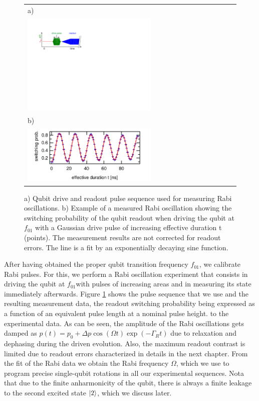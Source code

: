 \begin{figure}[h!]
\begin{center}
\begin{tabular}{l}
a) \\ \includegraphics[width=0.6\textwidth]{"./material/figures/measurement/qubit_rabi_oscillation"} \\
b) \\ \includegraphics[width=0.6\textwidth]{"./data/ct5/2011_04_21 - grover and tomo/example - qubit 2 rabi"} \\
\end{tabular}
\end{center}
\caption[]{a) Qubit drive and readout pulse sequence used for measuring Rabi oscillations. b) Example of a measured Rabi oscillation showing the switching probability of the qubit readout when driving the qubit at $f_{01}$ with a Gaussian drive pulse of increasing effective duration t (points). The measurement results are not corrected for readout errors. The line is a fit by an exponentially decaying sine function.}
\label{fig:qubit_rabi_example}
\end{figure}

After having obtained the proper qubit transition frequency $f_{01}$, we calibrate Rabi pulses. For this, we  perform a Rabi oscillation experiment that consists in driving the qubit at $f_{01} $with pulses of increasing areas and in measuring its state immediately afterwards. Figure \ref{fig:qubit_rabi_example} shows the pulse sequence that we use and the resulting measurement data, the readout switching probability being expressed as a function of an equivalent pulse length at a nominal pulse height. to the experimental data. As can be seen, the amplitude of the Rabi oscillations gets damped as  $p(t)=p_0+{\Delta}p\cos{(\Omega t)}\exp{(-\Gamma_R t)}$ due to relaxation and dephasing during the driven evolution. Also, the maximum readout contrast is limited due to readout errors characterized in details in the next chapter. From the fit of the Rabi data we obtain the Rabi frequency $\Omega$, which we use to program precise single-qubit rotations in all our experimental sequences. Nota that due to the finite anharmonicity of the qubit, there is always a finite leakage to the second excited state $\left| 2 \right>$, which we discuss later.

